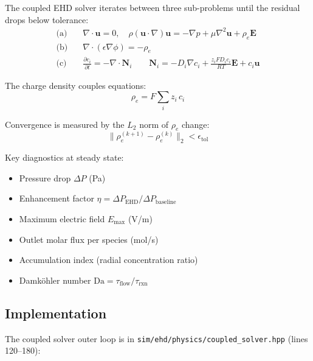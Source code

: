 \documentclass[11pt,a4paper]{article}
\begin{document}
The coupled EHD solver iterates between three sub-problems until the
residual drops below tolerance:
\begin{align}
  \text{(a)}\quad & \nabla\cdot\bm{u} = 0,\quad
    \rho(\bm{u}\cdot\nabla)\bm{u} = -\nabla p + \mu\nabla^{2}\bm{u}
    + \rho_{e}\bm{E} \label{eq:ns} \\
  \text{(b)}\quad & \nabla\cdot(\epsilon\nabla\phi) = -\rho_{e}
    \label{eq:poisson} \\
  \text{(c)}\quad & \frac{\partial c_{i}}{\partial t}
    = -\nabla\cdot\bm{N}_{i}
    \qquad
    \bm{N}_{i} = -D_{i}\nabla c_{i}
    + \frac{z_{i}FD_{i}c_{i}}{RT}\bm{E}
    + c_{i}\bm{u} \label{eq:np}
\end{align}

The charge density couples equations:
\begin{equation}
  \rho_{e} = F\sum_{i} z_{i}\,c_{i}
  \label{eq:rho_e}
\end{equation}

Convergence is measured by the $L_{2}$ norm of $\rho_{e}$ change:
\begin{equation}
  \|\rho_{e}^{(k+1)} - \rho_{e}^{(k)}\|_{2} < \epsilon_{\text{tol}}
  \label{eq:converge}
\end{equation}

Key diagnostics at steady state:
\begin{itemize}
  \item Pressure drop $\Delta P$ (Pa)
  \item Enhancement factor $\eta = \Delta P_{\text{EHD}} / \Delta P_{\text{baseline}}$
  \item Maximum electric field $E_{\max}$ (V/m)
  \item Outlet molar flux per species (mol/s)
  \item Accumulation index (radial concentration ratio)
  \item Damk\"ohler number $\text{Da} = \tau_{\text{flow}} / \tau_{\text{rxn}}$
\end{itemize}

\subsection{Implementation}

The coupled solver outer loop is in
\texttt{sim/ehd/physics/coupled\_solver.hpp} (lines 120--180):
\end{document}
